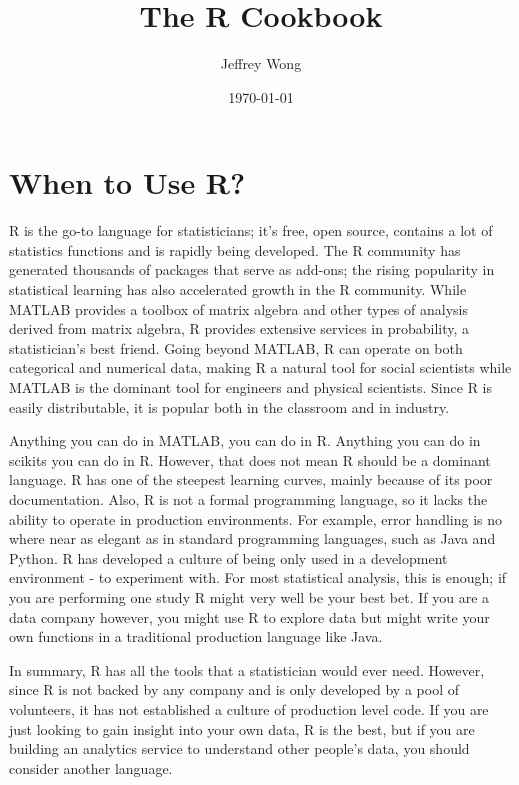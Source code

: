 \documentclass{article}
\title{The R Cookbook}
\author{Jeffrey Wong}
\date{\today}
\begin{document}
\maketitle

\tableofcontents

\newpage

\section{When to Use R?}

R is the go-to language for statisticians; it's free, open source, contains
a lot of statistics functions and is rapidly being developed.  The R community
has generated thousands of packages that serve as add-ons; the rising popularity
in statistical learning has also accelerated growth in the R community.
While MATLAB provides a toolbox of matrix algebra and other types of analysis
derived from matrix algebra, R provides extensive services in probability,
a statistician's best friend.  Going beyond MATLAB, R can operate on both
categorical and numerical data, making R a natural tool for social scientists
while MATLAB is the dominant tool for engineers and physical scientists.
Since R is easily distributable, it is popular both in the classroom and in industry.

Anything you can do in MATLAB, you can do in R.  Anything you can do in scikits
you can do in R.  However, that does not mean R should be a dominant language.
R has one of the steepest learning curves, mainly because of its poor documentation.
Also, R is not a formal programming language, so it lacks the ability to operate
in production environments.  For example, error handling is no where near as elegant
as in standard programming languages, such as Java and Python.  R has developed
a culture of being only used in a development environment - to experiment with.
For most statistical analysis, this is enough; if you are performing one study
R might very well be your best bet.  If you are a data company however, you might
use R to explore data but might write your own functions in a traditional production
language like Java.

In summary, R has all the tools that a statistician would ever need.  However,
since R is not backed by any company and is only developed by a pool of volunteers,
it has not established a culture of production level code.  If you are just looking
to gain insight into your own data, R is the best, but if you are building an analytics
service to understand other people's data, you should consider another language.
\end{document}
